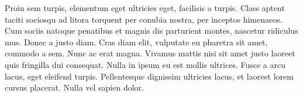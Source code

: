Proin sem turpis, elementum eget ultricies eget, facilisis a turpis. Class aptent taciti sociosqu ad litora torquent per conubia nostra, per inceptos himenaeos. Cum sociis natoque penatibus et magnis dis parturient montes, nascetur ridiculus mus. Donec a justo diam. Cras diam elit, vulputate eu pharetra sit amet, commodo a sem. Nunc ac erat magna. Vivamus mattis nisi sit amet justo laoreet quis fringilla dui consequat. Nulla in ipsum eu est mollis ultrices. Fusce a arcu lacus, eget eleifend turpis. Pellentesque dignissim ultricies lacus, et laoreet lorem cursus placerat. Nulla vel sapien dolor. 
